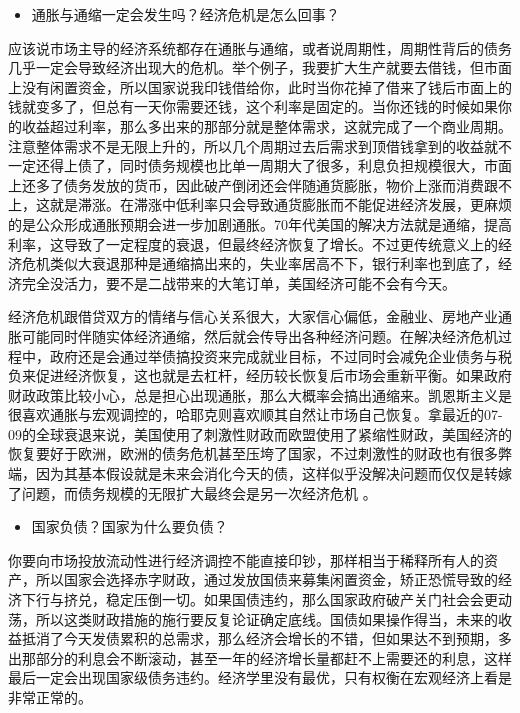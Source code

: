 \documentclass[
  letterpaper,
  DIV=11,
  numbers=noendperiod]{scrreprt}
\providecommand{\tightlist}{%
  \setlength{\itemsep}{0pt}\setlength{\parskip}{0pt}}\usepackage{longtable,booktabs,array}
\begin{document}
\begin{itemize}
\tightlist
\item
  通胀与通缩一定会发生吗？经济危机是怎么回事？
\end{itemize}

应该说市场主导的经济系统都存在通胀与通缩，或者说周期性，周期性背后的债务几乎一定会导致经济出现大的危机。举个例子，我要扩大生产就要去借钱，但市面上没有闲置资金，所以国家说我印钱借给你，此时当你花掉了借来了钱后市面上的钱就变多了，但总有一天你需要还钱，这个利率是固定的。当你还钱的时候如果你的收益超过利率，那么多出来的那部分就是整体需求，这就完成了一个商业周期。注意整体需求不是无限上升的，所以几个周期过去后需求到顶借钱拿到的收益就不一定还得上债了，同时债务规模也比单一周期大了很多，利息负担规模很大，市面上还多了债务发放的货币，因此破产倒闭还会伴随通货膨胀，物价上涨而消费跟不上，这就是滞涨。在滞涨中低利率只会导致通货膨胀而不能促进经济发展，更麻烦的是公众形成通胀预期会进一步加剧通胀。70年代美国的解决方法就是通缩，提高利率，这导致了一定程度的衰退，但最终经济恢复了增长。不过更传统意义上的经济危机类似大衰退那种是通缩搞出来的，失业率居高不下，银行利率也到底了，经济完全没活力，要不是二战带来的大笔订单，美国经济可能不会有今天。

经济危机跟借贷双方的情绪与信心关系很大，大家信心偏低，金融业、房地产业通胀可能同时伴随实体经济通缩，然后就会传导出各种经济问题。在解决经济危机过程中，政府还是会通过举债搞投资来完成就业目标，不过同时会减免企业债务与税负来促进经济恢复，这也就是去杠杆，经历较长恢复后市场会重新平衡。如果政府财政政策比较小心，总是担心出现通胀，那么大概率会搞出通缩来。凯恩斯主义是很喜欢通胀与宏观调控的，哈耶克则喜欢顺其自然让市场自己恢复。拿最近的07-09的全球衰退来说，美国使用了刺激性财政而欧盟使用了紧缩性财政，美国经济的恢复要好于欧洲，欧洲的债务危机甚至压垮了国家，不过刺激性的财政也有很多弊端，因为其基本假设就是未来会消化今天的债，这样似乎没解决问题而仅仅是转嫁了问题，而债务规模的无限扩大最终会是另一次经济危机
。

\begin{itemize}
\tightlist
\item
  国家负债？国家为什么要负债？
\end{itemize}

你要向市场投放流动性进行经济调控不能直接印钞，那样相当于稀释所有人的资产，所以国家会选择赤字财政，通过发放国债来募集闲置资金，矫正恐慌导致的经济下行与挤兑，稳定压倒一切。如果国债违约，那么国家政府破产关门社会会更动荡，所以这类财政措施的施行要反复论证确定底线。国债如果操作得当，未来的收益抵消了今天发债累积的总需求，那么经济会增长的不错，但如果达不到预期，多出那部分的利息会不断滚动，甚至一年的经济增长量都赶不上需要还的利息，这样最后一定会出现国家级债务违约。经济学里没有最优，只有权衡在宏观经济上看是非常正常的。
\end{document}
